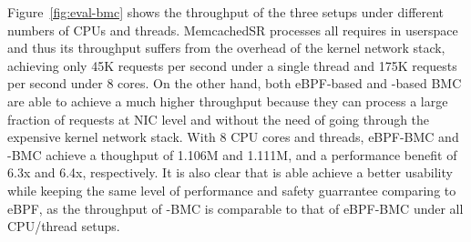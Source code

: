 Figure~\ref{fig:eval-bmc} shows the throughput of the three setups under
    different numbers of CPUs and threads.
MemcachedSR processes all requires in userspace and thus its throughput suffers
    from the overhead of the kernel network stack, achieving only 45K requests
    per second under a single thread and 175K requests per second under 8
    cores.
On the other hand, both eBPF-based and \projname{}-based BMC are able to
    achieve a much higher throughput because they can process a large
    fraction of requests at NIC level and without the need of going through
    the expensive kernel network stack.
With 8 CPU cores and threads, eBPF-BMC and \projname{}-BMC achieve a thoughput
    of 1.106M and 1.111M, and a performance benefit of 6.3x and 6.4x,
    respectively.
It is also clear that \projname{} is able achieve a better usability while
    keeping the same level of performance and safety guarrantee comparing to
    eBPF,  as the throughput of \projname{}-BMC is comparable to that of
    eBPF-BMC under all CPU/thread setups.
